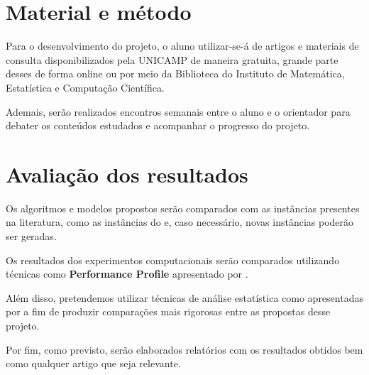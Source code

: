 \documentclass[11pt]{article}
\begin{document}
\section{Material e método}
\label{sec:org8f789be}
Para o desenvolvimento do projeto, o aluno utilizar-se-á de artigos e materiais de consulta disponibilizados pela UNICAMP de maneira gratuita, grande parte desses de forma online ou por meio da Biblioteca do Instituto de Matemática, Estatística e Computação Científica.

Ademais, serão realizados encontros semanais entre o aluno e o orientador para debater os conteúdos estudados e acompanhar o progresso do projeto.

\section{Avaliação dos resultados}
\label{sec:org4a387b1}
Os algoritmos e modelos propostos serão comparados com as instâncias presentes na literatura, como as instâncias do \textcite{DIMACSGraphColoringInstances} e, caso necessário, novas instâncias poderão ser geradas.

Os resultados dos experimentos computacionais serão comparados utilizando técnicas como \textbf{Performance Profile} apresentado por \textcite{Dolan2002Benchmarkingoptimizationsoftware}.

Além disso, pretendemos utilizar técnicas de análise estatística como apresentadas por \textcite{Derrac2011practicaltutorialuse} a fim de produzir comparações mais rigorosas entre as propostas desse projeto.

Por fim, como previsto, serão elaborados relatórios com os resultados obtidos bem como qualquer artigo que seja relevante.

\printbibliography
\end{document}

